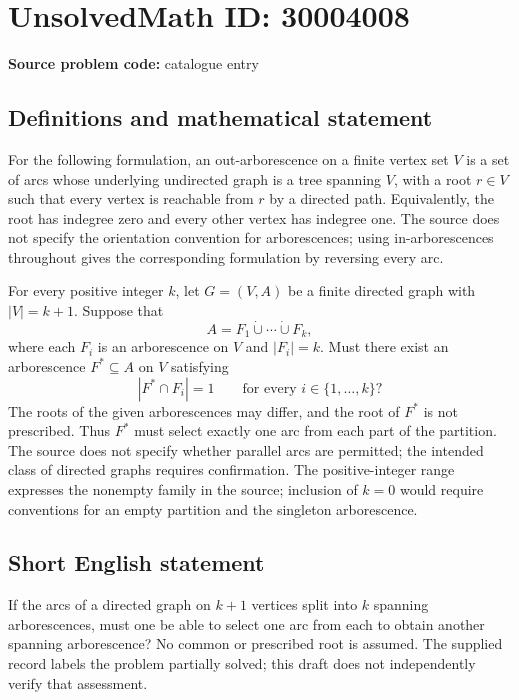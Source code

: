 \documentclass[11pt]{article}
\begin{document}
\section*{UnsolvedMath ID: 30004008}
\textbf{Source problem code:} catalogue entry
\subsection{Definitions and mathematical statement}
For the following formulation, an out-arborescence on a finite vertex set \(V\) is a set of arcs whose underlying undirected graph is a tree spanning \(V\), with a root \(r\in V\) such that every vertex is reachable from \(r\) by a directed path. Equivalently, the root has indegree zero and every other vertex has indegree one. The source does not specify the orientation convention for arborescences; using in-arborescences throughout gives the corresponding formulation by reversing every arc.

For every positive integer \(k\), let \(G=(V,A)\) be a finite directed graph with \(|V|=k+1\). Suppose that
\[
A=F_1\mathbin{\dot\cup}\cdots\mathbin{\dot\cup}F_k,
\]
where each \(F_i\) is an arborescence on \(V\) and \(|F_i|=k\). Must there exist an arborescence \(F^*\subseteq A\) on \(V\) satisfying
\[
|F^*\cap F_i|=1\qquad\text{for every }i\in\{1,\ldots,k\}?
\]
The roots of the given arborescences may differ, and the root of \(F^*\) is not prescribed. Thus \(F^*\) must select exactly one arc from each part of the partition. The source does not specify whether parallel arcs are permitted; the intended class of directed graphs requires confirmation. The positive-integer range expresses the nonempty family in the source; inclusion of \(k=0\) would require conventions for an empty partition and the singleton arborescence.
\subsection{Short English statement}
If the arcs of a directed graph on \(k+1\) vertices split into \(k\) spanning arborescences, must one be able to select one arc from each to obtain another spanning arborescence? No common or prescribed root is assumed. The supplied record labels the problem partially solved; this draft does not independently verify that assessment.
\end{document}
